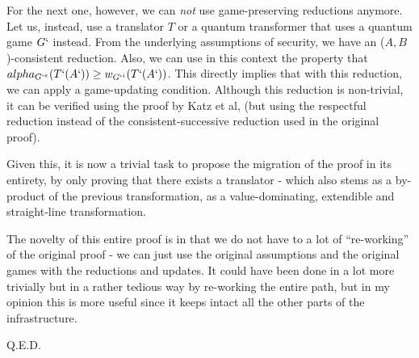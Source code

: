 \documentclass[10pt,a4paper]{article}
\begin{document}
For the next one, however, we can \textit{not} use game-preserving reductions anymore. Let us, instead, use a translator $T$ or a quantum transformer that uses a quantum game $G`$ instead. From the underlying assumptions of security, we have an ($A,B$)-consistent reduction. Also, we can use in this context the property that $alpha_{G`^e}(T`(A`)) \geq w_{G`^i}(T`(A`))$.  This directly implies that with this reduction, we can apply a game-updating condition. Although this reduction is non-trivial, it can be verified using the proof by Katz et al, (but using the respectful reduction instead of the consistent-successive reduction used in the original proof).

Given this, it is now a trivial task to propose the migration of the proof in its entirety, by only proving that there exists a translator - which also stems as a by-product of the previous transformation, as a value-dominating, extendible and straight-line transformation. 

The novelty of this entire proof is in that we do not have to a lot of ``re-working'' of the original proof - we can just use the original assumptions and the original games with the reductions and updates. It could have been done in a lot more trivially but in a rather tedious way by re-working the entire path, but in my opinion this is more useful since it keeps intact all the other parts of the infrastructure.

Q.E.D.
\end{document}
